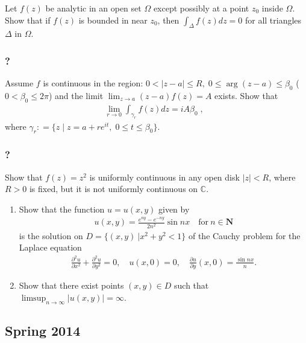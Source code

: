 Let \(f(z)\) be analytic in an open set \(\Omega\) except possibly at a
point \(z_0\) inside \(\Omega\). Show that if \(f(z)\) is bounded in
near \(z_0\), then \(\displaystyle \int_\Delta f(z) dz = 0\) for all
triangles \(\Delta\) in \(\Omega\).

\hypertarget{section-125}{%
\subsubsection{?}\label{section-125}}

Assume \(f\) is continuous in the region:
\(0< |z-a| \leq R, \; 0 \leq \arg(z-a) \leq \beta_0\)
(\(0 < \beta_0 \leq 2 \pi\)) and the limit
\(\displaystyle \lim_{z \rightarrow a} (z-a) f(z) = A\) exists. Show
that
\begin{align*}\lim_{r \rightarrow 0} \int_{\gamma_r} f(z) dz  = i A \beta_0 \; , \; \;\end{align*}
where
\(\gamma_r : = \{ z \; | \; z = a + r e^{it}, \; 0 \leq t \leq \beta_0 \}.\)

\hypertarget{section-126}{%
\subsubsection{?}\label{section-126}}

Show that \(f(z) = z^2\) is uniformly continuous in any open disk
\(|z| < R\), where \(R>0\) is fixed, but it is not uniformly continuous
on \(\mathbb C\).

\begin{enumerate}
\def\labelenumi{(\arabic{enumi})}
\tightlist
\item
  Show that the function \(u=u(x,y)\) given by
  \begin{align*}u(x,y)=\frac{e^{ny}-e^{-ny}}{2n^2}\sin nx\quad \text{for}\ n\in {\mathbf N}\end{align*}
  is the solution on \(D=\{(x,y)\ | x^2+y^2<1\}\) of the Cauchy problem
  for the Laplace equation
  \begin{align*}\frac{\partial ^2u}{\partial x^2}+\frac{\partial ^2u}{\partial y^2}=0,\quad
  u(x,0)=0,\quad \frac{\partial u}{\partial y}(x,0)=\frac{\sin nx}{n}.\end{align*}
\item
  Show that there exist points \((x,y)\in D\) such that
  \(\displaystyle{\limsup_{n\to\infty} |u(x,y)|=\infty}\).
\end{enumerate}

\hypertarget{spring-2014}{%
\subsection{Spring 2014}\label{spring-2014}}

